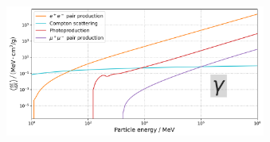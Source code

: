 \begin{frame}{}
\begin{minipage}[t][1cm][t]{\textwidth}
\begin{columns}[t]
\begin{figure}
    \end{figure}
    \vspace{-10pt}
    \begin{figure}
      \includegraphics[width=\linewidth, height=.4\textheight, keepaspectratio]{plots/photon_dEdx.png}
    \end{figure}
  \end{columns}

  \end{minipage}


\end{frame}


